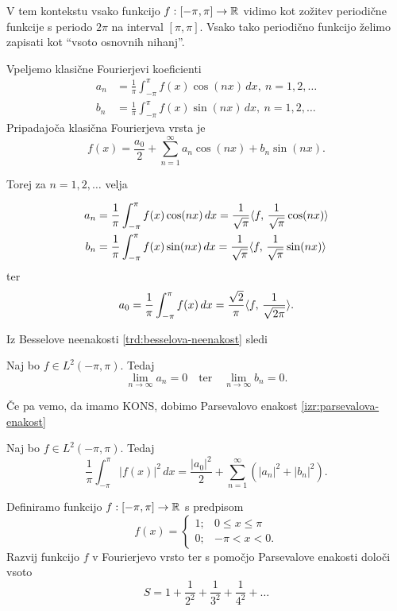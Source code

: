 \begin{opomba}
    V tem kontekstu vsako funkcijo \(f: [-\pi, \pi] \to \mathbb{R}\) vidimo kot zožitev periodične funkcije s periodo \(2\pi\) na interval \([\pi, \pi]\).
    Vsako tako periodično funkcijo želimo zapisati kot "`vsoto osnovnih nihanj"'.
\end{opomba}

Vpeljemo klasične Fourierjevi koeficienti
\begin{align*}
    a_n &= \frac{1}{\pi} \int_{-\pi}^{\pi} f(x) \cos (nx) \, dx, \ n = 1, 2, \ldots \\
    b_n &= \frac{1}{\pi} \int_{-\pi}^{\pi} f(x) \sin (nx) \, dx, \ n = 1, 2, \ldots
\end{align*}
Pripadajoča klasična Fourierjeva vrsta je 
\[
    f(x) = \frac{a_0}{2} + \sum_{n=1}^{\infty} a_n \cos(nx) + b_n \sin(nx).
\]

Torej za \(n = 1, 2, \ldots\) velja

\begin{align*}
    a_n &= \frac{1}{\pi} \int_{-\pi}^{\pi}f(x) \cos(nx) \, dx = \frac{1}{\sqrt{\pi}} \langle f, \, \frac{1}{\sqrt{\pi}} \cos(nx) \rangle \\
    b_n &= \frac{1}{\pi} \int_{-\pi}^{\pi}f(x) \sin(nx) \, dx = \frac{1}{\sqrt{\pi}} \langle f, \, \frac{1}{\sqrt{\pi}} \sin(nx) \rangle
\end{align*}
ter
\[
a_0 = \frac{1}{\pi} \int_{-\pi}^{\pi} f(x) \, dx = \frac{\sqrt{2}}{\pi} \langle f, \, \frac{1}{\sqrt{2\pi}} \rangle.
\]

Iz Besselove neenakosti \ref{trd:besselova-neenakost} sledi
\begin{trditev}
    Naj bo \(f \in L^2(-\pi, \pi)\). Tedaj 
    \[
        \lim_{n \to \infty} a_n = 0 \quad \text{ter} \quad \lim_{n \to \infty} b_n = 0.
    \]
\end{trditev}

Če pa vemo, da imamo KONS, dobimo Parsevalovo enakost \ref{izr:parsevalova-enakost}
\begin{trditev}
    Naj bo \(f \in L^2(-\pi, \pi)\). Tedaj 
    \[
        \frac{1}{\pi} \int_{-\pi}^{\pi}|f(x)|^2 \, dx = \frac{|a_0|^2}{2} + \sum_{n=1}^{\infty}(|a_n|^2+|b_n|^2).
    \]
\end{trditev}

\begin{zgled}
    \label{zgl:nič-ena}
    Definiramo funkcijo \(f: [-\pi, \pi] \to \mathbb{R}\) s predpisom
    \[
        f(x) = \begin{cases}
            1; &0 \leq x \leq \pi \\
            0; &-\pi < x < 0.
        \end{cases}
    \]
    Razvij funkcijo \(f\) v Fourierjevo vrsto ter s pomočjo Parsevalove enakosti določi vsoto 
    \[
        S = 1 + \frac{1}{2^2} + \frac{1}{3^2} + \frac{1}{4^2} + \ldots
    \]
\end{zgled}

